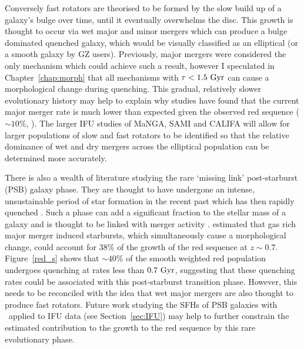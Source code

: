 Conversely fast rotators are theorised to be formed by the slow build up of a galaxy's bulge over time, until it eventually overwhelms the disc. This growth is thought to occur via wet major and minor mergers \citep{duc11} which can produce a bulge dominated quenched galaxy, which would be visually classified as an elliptical (or a smooth galaxy by GZ users). Previously, major mergers were considered the only mechanism which could achieve such a result, however I speculated in Chapter~\ref{chap:morph} that all mechanisms with $\tau < 1.5 ~\rm{Gyr}$ can cause a morphological change during quenching. This gradual, relatively slower evolutionary history may help to explain why studies have found that the current major merger rate is much lower than expected given the observed red sequence ($\sim 10\%$, \citealt{Lotz11}). The larger IFU studies of MaNGA, SAMI and CALIFA will allow for larger populations of slow and fast rotators to be identified so that the relative dominance of wet and dry mergers across the elliptical population can be determined more accurately. 

There is also a wealth of literature studying the rare \citep[$<1\%$;][]{Wong12, wild16} `missing link' post-starburst (PSB) galaxy phase. They are thought to have undergone an intense, unsustainable period of star formation in the recent past which has then rapidly quenched \citep{dressler83, abraham96b, poggianti99, goto03, goto05b, goto07}. Such a phase can add a significant fraction \citep[$\sim10\%$;][]{wild10} to the stellar mass of a galaxy and is thought to be linked with merger activity \citep{zabludoff96, blake04, goto05b, yang08, pawlik16}. \citet{Wild09} estimated that gas rich major merger induced starbursts, which simultaneously cause a morphological change, could account for $38\%$ of the growth of the red sequence at $z\sim0.7$. Figure~\ref{red_s} shows that $\sim40\%$ of the smooth weighted red population undergoes quenching at rates less than $0.7~\rm{Gyr}$, suggesting that these quenching rates could be associated with this post-starburst transition phase. However, this needs to be reconciled with the idea that wet major mergers are also thought to produce fast rotators. Future work studying the SFHs of PSB galaxies with \starpy\ applied to IFU data (see Section~\ref{sec:IFU}) may help to further constrain the estimated contribution to the growth to the red sequence by this rare evolutionary phase. 

